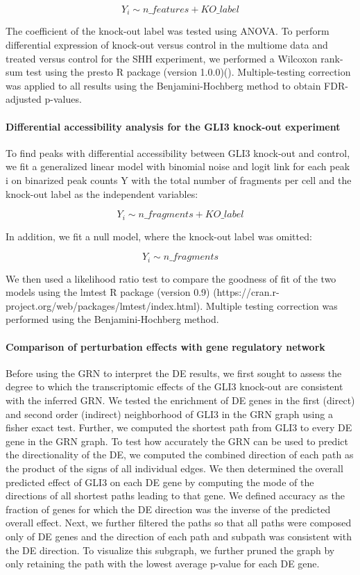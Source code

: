 \[ Y_i \sim n\_features + KO\_label \]
 
The coefficient of the knock-out label was tested using ANOVA. To perform differential expression of knock-out versus control in the multiome data and treated versus control for the SHH experiment, we performed a Wilcoxon rank-sum test using the presto R package (version 1.0.0)(\cite{korsunsky_presto_2019}). Multiple-testing correction was applied to all results using the Benjamini-Hochberg method to obtain FDR-adjusted p-values.
 
 
\paragraph{Differential accessibility analysis for the GLI3 knock-out experiment}
To find peaks with differential accessibility between GLI3 knock-out and control, we fit a generalized linear model with binomial noise and logit link for each peak i on binarized peak counts Y with the total number of fragments per cell and the knock-out label as the independent variables:
 
\[ Y_i \sim n\_fragments + KO\_label \]
 
In addition, we fit a null model, where the knock-out label was omitted:
 
\[ Y_i \sim n\_fragments\]
 
We then used a likelihood ratio test to compare the goodness of fit of the two models using the lmtest R package (version 0.9) (https://cran.r-project.org/web/packages/lmtest/index.html). Multiple testing correction was performed using the Benjamini-Hochberg method.
 
\paragraph{Comparison of perturbation effects with gene regulatory network}
Before using the GRN to interpret the DE results, we first sought to assess the degree to which the transcriptomic effects of the GLI3 knock-out are consistent with the inferred GRN. We tested the enrichment of DE genes in the first (direct) and second order (indirect) neighborhood of GLI3 in the GRN graph using a fisher exact test. Further, we computed the shortest path from GLI3 to every DE gene in the GRN graph. To test how accurately the GRN can be used to predict the directionality of the DE, we computed the combined direction of each path as the product of the signs of all individual edges. We then determined the overall predicted effect of GLI3 on each DE gene by computing the mode of the directions of all shortest paths leading to that gene. We defined accuracy as the fraction of genes for which the DE direction was the inverse of the predicted overall effect. Next, we further filtered the paths so that all paths were composed only of DE genes and the direction of each path and subpath was consistent with the DE direction. To visualize this subgraph, we further pruned the graph by only retaining the path with the lowest average  p-value for each DE gene.
 
